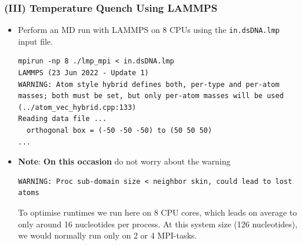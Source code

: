 \documentclass[slidestop,compress,9pt]{beamer}
\begin{document}
\begin{frame}[fragile]
\frametitle{(III) Temperature Quench Using LAMMPS}

\begin{itemize}
\item Perform an MD run with LAMMPS on 8 CPUs using the \texttt{in.dsDNA.lmp} input file.
\begin{lstlisting}
mpirun -np 8 ./lmp_mpi < in.dsDNA.lmp 
LAMMPS (23 Jun 2022 - Update 1)
WARNING: Atom style hybrid defines both, per-type and per-atom masses; both must be set, but only per-atom masses will be used (../atom_vec_hybrid.cpp:133)
Reading data file ...
  orthogonal box = (-50 -50 -50) to (50 50 50)
...
\end{lstlisting}
\item \textbf{Note}: \textbf{On this occasion} do not worry about the warning
\begin{lstlisting}
WARNING: Proc sub-domain size < neighbor skin, could lead to lost atoms
\end{lstlisting}
To optimise runtimes we run here on 8 CPU cores, which leads on average to only around 16 nucleotides per process. At this system size (126 nucleotides), we would normally run only on 2 or 4 MPI-tasks.
\end{itemize}

\end{frame}
\end{document}
